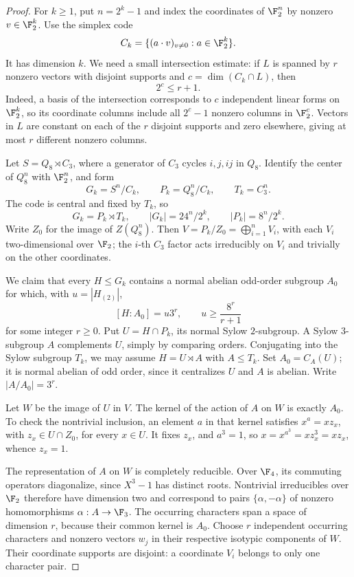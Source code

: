 \begin{proof}
For \(k\geq1\), put \(n=2^k-1\) and index the coordinates of
\(\F_2^n\) by nonzero \(v\in\F_2^k\). Use the simplex code
\[
 C_k=\{(a\cdot v)_{v\ne0}:a\in\F_2^k\}.
\]
It has dimension \(k\). We need a small intersection estimate:
if \(L\) is spanned by \(r\) nonzero vectors with disjoint supports
and \(c=\dim(C_k\cap L)\), then
\begin{equation}\label{eq:simplex-intersection}
 2^c\leq r+1.
\end{equation}
Indeed, a basis of the intersection corresponds to \(c\) independent
linear forms on \(\F_2^k\), so its coordinate columns include all
\(2^c-1\) nonzero columns in \(\F_2^c\). Vectors in \(L\) are
constant on each of the \(r\) disjoint supports and zero elsewhere,
giving at most \(r\) different nonzero columns.

Let \(S=Q_8\rtimes C_3\), where a generator of \(C_3\) cycles
\(i,j,ij\) in \(Q_8\). Identify the center of \(Q_8^n\) with
\(\F_2^n\), and form
\[
 G_k=S^n/C_k,\qquad P_k=Q_8^n/C_k,\qquad T_k=C_3^n.
\]
The code is central and fixed by \(T_k\), so
\[
 G_k=P_k\rtimes T_k,\qquad
 |G_k|=24^n/2^k,\qquad |P_k|=8^n/2^k.
\]
Write \(Z_0\) for the image of \(Z(Q_8^n)\). Then
\(V=P_k/Z_0=\bigoplus_{i=1}^n V_i\), with each \(V_i\)
two-dimensional over \(\F_2\); the \(i\)-th \(C_3\) factor acts
irreducibly on \(V_i\) and trivially on the other coordinates.

We claim that every \(H\leq G_k\) contains a normal abelian
odd-order subgroup \(A_0\) for which, with \(u=|H_{(2)}|\),
\begin{equation}\label{eq:jordan-subgroup}
 [H:A_0]=u3^r,\qquad u\geq\frac{8^r}{r+1}
\end{equation}
for some integer \(r\geq0\).
Put \(U=H\cap P_k\), its normal Sylow \(2\)-subgroup. A Sylow
\(3\)-subgroup \(A\) complements \(U\), simply by comparing
orders. Conjugating into the Sylow subgroup \(T_k\), we may assume
\(H=U\rtimes A\) with \(A\leq T_k\). Set \(A_0=C_A(U)\);
it is normal abelian of odd order, since it centralizes \(U\)
and \(A\) is abelian. Write \(|A/A_0|=3^r\).

Let \(W\) be the image of \(U\) in \(V\). The kernel of the
action of \(A\) on \(W\) is exactly \(A_0\). To check the
nontrivial inclusion, an element \(a\) in that kernel satisfies
\(x^a=xz_x\), with \(z_x\in U\cap Z_0\), for every \(x\in U\).
It fixes \(z_x\), and \(a^3=1\), so
\(x=x^{a^3}=xz_x^3=xz_x\), whence \(z_x=1\).

The representation of \(A\) on \(W\) is completely reducible.
Over \(\F_4\), its commuting operators diagonalize, since
\(X^3-1\) has distinct roots. Nontrivial irreducibles over
\(\F_2\) therefore have dimension two and correspond to pairs
\(\{\alpha,-\alpha\}\) of nonzero homomorphisms
\(\alpha:A\to\F_3\). The occurring characters span a space of
dimension \(r\), because their common kernel is \(A_0\).
Choose \(r\) independent occurring characters and nonzero vectors
\(w_j\) in their respective isotypic components of \(W\).
Their coordinate supports are disjoint: a coordinate \(V_i\)
belongs to only one character pair.


\end{proof}
